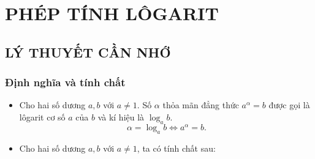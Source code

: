 \section{PHÉP TÍNH LÔGARIT}
\subsection{LÝ THUYẾT CẦN NHỚ}
\subsubsection{Định nghĩa và tính chất}
	\begin{itemize}
			\item [\iconMT] Cho hai số dương $a, b$ với $a\neq 1$. Số $\alpha$ thỏa mãn đẳng thức $a^{\alpha}=b$ được gọi là lôgarit cơ số $a$ của $b$ và kí hiệu là $\log_ab$.
			$$\alpha=\log_ab \Leftrightarrow a^{\alpha}=b.$$
			\item [\iconMT] Cho hai số dương $a, b$ với $a\neq 1$, ta có tính chất sau:
			\begin{boxdn}
		\end{boxdn}	
	\end{itemize}

